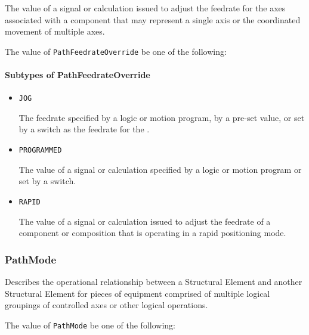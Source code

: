 The value of a signal or calculation issued to adjust the feedrate for the axes associated with a  component that may represent a single axis or the coordinated movement of multiple axes.


The value of \texttt{PathFeedrateOverride} \MUST be one of the following: 

\FloatBarrier

\paragraph{Subtypes of PathFeedrateOverride}\mbox{}
\label{sec:Subtypes of PathFeedrateOverride}

\begin{itemize}

\item \texttt{JOG}


The feedrate specified by a logic or motion program, by a pre-set value, or set by a switch as the feedrate for the . 

\item \texttt{PROGRAMMED}


The value of a signal or calculation specified by a logic or motion program or set by a switch.

\item \texttt{RAPID}


The value of a signal or calculation issued to adjust the feedrate of a component or composition that is operating in a rapid positioning mode.


\end{itemize}

\subsubsection{PathMode}
\label{sec:PathMode}



Describes the operational relationship between a  \gls{Structural Element} and another  \gls{Structural Element} for pieces of equipment comprised of multiple logical groupings of controlled axes or other logical operations.


The value of \texttt{PathMode} \MUST be one of the following: 


